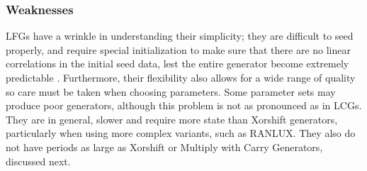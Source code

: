 \subsubsection{Weaknesses}
LFGs have a wrinkle in understanding their simplicity; they are difficult to seed properly, and require special initialization to make sure that there are no linear correlations in the initial seed data, lest the entire generator become extremely predictable \cite{Matsumoto:2007:CDI:1276927.1276928}. Furthermore, their flexibility also allows for a wide range of quality so care must be taken when choosing parameters. Some parameter sets may produce poor generators, although this problem is not as pronounced as in LCGs. They are in general, slower and require more state than Xorshift generators, particularly when using more complex variants, such as RANLUX. They also do not have periods as large as Xorshift or Multiply with Carry Generators, discussed next.
